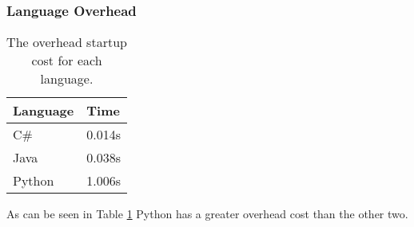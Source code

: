 \subsubsection{Language Overhead} \label{subsec:language_overhead}

\begin{table}[h]
	\begin{center}
		\begin{tabular} { >{\centering\arraybackslash}m{3cm} | >{\centering\arraybackslash}m{2cm} }
			\hline
			\textbf{Language}	& \textbf{Time} \\ \hline
			C\#				& 0.014s \\ \hline
			Java				& 0.038s \\ \hline
			Python				& 1.006s \\  \hline
		\end{tabular}
	\end{center}
	\caption{The overhead startup cost for each language.}
	\label{table:language_overhead}
\end{table}

As can be seen in Table \ref{table:language_overhead} Python has a greater overhead cost than the other two.
